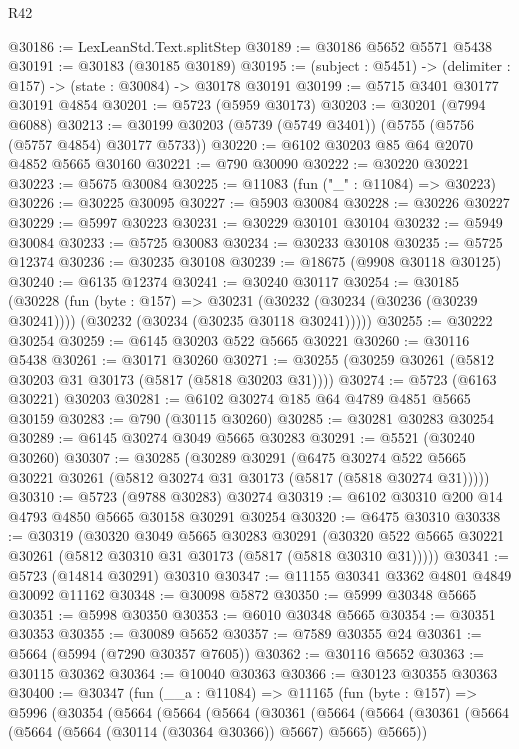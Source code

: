 \begin{lexlean}{R42}
\begin{coremodule}
@30186 := LexLeanStd.Text.splitStep
@30189 := @30186 @5652 @5571 @5438
@30191 := @30183 (@30185 @30189)
@30195 := (subject : @5451) -> (delimiter : @157) -> (state : @30084) -> @30178 @30191
@30199 := @5715 @3401 @30177 @30191 @4854
@30201 := @5723 (@5959 @30173)
@30203 := @30201 (@7994 @6088)
@30213 := @30199 @30203 (@5739 (@5749 @3401)) (@5755 (@5756 (@5757 @4854) @30177 @5733))
@30220 := @6102 @30203 @85 @64 @2070 @4852 @5665 @30160
@30221 := @790 @30090
@30222 := @30220 @30221
@30223 := @5675 @30084
@30225 := @11083 (fun ("_" : @11084) => @30223)
@30226 := @30225 @30095
@30227 := @5903 @30084
@30228 := @30226 @30227
@30229 := @5997 @30223
@30231 := @30229 @30101 @30104
@30232 := @5949 @30084
@30233 := @5725 @30083
@30234 := @30233 @30108
@30235 := @5725 @12374
@30236 := @30235 @30108
@30239 := @18675 (@9908 @30118 @30125)
@30240 := @6135 @12374
@30241 := @30240 @30117
@30254 := @30185
    (@30228
      (fun (byte : @157) =>
      @30231 (@30232 (@30234 (@30236 (@30239 @30241)))) (@30232 (@30234 (@30235 @30118 @30241)))))
@30255 := @30222 @30254
@30259 := @6145 @30203 @522 @5665 @30221
@30260 := @30116 @5438
@30261 := @30171 @30260
@30271 := @30255 (@30259 @30261 (@5812 @30203 @31 @30173 (@5817 (@5818 @30203 @31))))
@30274 := @5723 (@6163 @30221) @30203
@30281 := @6102 @30274 @185 @64 @4789 @4851 @5665 @30159
@30283 := @790 (@30115 @30260)
@30285 := @30281 @30283 @30254
@30289 := @6145 @30274 @3049 @5665 @30283
@30291 := @5521 (@30240 @30260)
@30307 := @30285
    (@30289
      @30291
      (@6475 @30274 @522 @5665 @30221 @30261 (@5812 @30274 @31 @30173 (@5817 (@5818 @30274 @31)))))
@30310 := @5723 (@9788 @30283) @30274
@30319 := @6102 @30310 @200 @14 @4793 @4850 @5665 @30158 @30291 @30254
@30320 := @6475 @30310
@30338 := @30319
    (@30320
      @3049
      @5665
      @30283
      @30291
      (@30320 @522 @5665 @30221 @30261 (@5812 @30310 @31 @30173 (@5817 (@5818 @30310 @31)))))
@30341 := @5723 (@14814 @30291) @30310
@30347 := @11155 @30341 @3362 @4801 @4849 @30092 @11162
@30348 := @30098 @5872
@30350 := @5999 @30348 @5665
@30351 := @5998 @30350
@30353 := @6010 @30348 @5665
@30354 := @30351 @30353
@30355 := @30089 @5652
@30357 := @7589 @30355 @24
@30361 := @5664 (@5994 (@7290 @30357 @7605))
@30362 := @30116 @5652
@30363 := @30115 @30362
@30364 := @10040 @30363
@30366 := @30123 @30355 @30363
@30400 := @30347
    (fun (__a : @11084) =>
    @11165
      (fun (byte : @157) =>
      @5996
        (@30354
          (@5664
            (@5664
              (@5664
                (@30361
                  (@5664
                    (@5664
                      (@30361 (@5664 (@5664 (@5664 (@30114 (@30364 @30366)) @5667) @5665) @5665))

\end{coremodule}
\end{lexlean}
